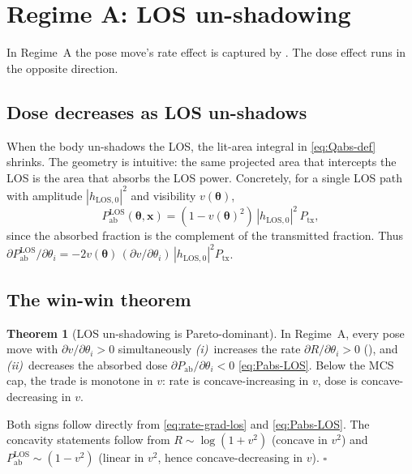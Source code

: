 \documentclass[11pt,a4paper]{article}
\theoremstyle{definition}
\newtheorem{theorem}{Theorem}[section]
\newcommand{\xvec}{\mathbf{x}}
\newcommand{\thetab}{\bm{\theta}}
\newcommand{\Pabs}{P_{\mathrm{ab}}}
\begin{document}
\section{Regime A: LOS un-shadowing}\label{sec:los-unshadow}

In Regime~A the pose move's rate effect is captured by
.  The dose effect runs in the opposite
direction.

\subsection{Dose decreases as LOS un-shadows}

When the body un-shadows the LOS, the lit-area integral in
\eqref{eq:Qabs-def} shrinks.  The geometry is intuitive: the same
projected area that intercepts the LOS is the area that absorbs the
LOS power.  Concretely, for a single LOS path with amplitude
$|h_{\mathrm{LOS},0}|^2$ and visibility $v(\thetab)$,
\begin{equation}\label{eq:Pabs-LOS}
  \Pabs^{\mathrm{LOS}}(\thetab,\xvec)
  =(1-v(\thetab)^2)\,|h_{\mathrm{LOS},0}|^2\,P_{\mathrm{tx}},
\end{equation}
since the absorbed fraction is the complement of the transmitted
fraction.  Thus
$\partial\Pabs^{\mathrm{LOS}}/\partial\theta_i = -2v(\thetab)\,
(\partial v/\partial\theta_i)\,|h_{\mathrm{LOS},0}|^2P_{\mathrm{tx}}$.

\subsection{The win-win theorem}

\begin{theorem}[LOS un-shadowing is Pareto-dominant]\label{thm:los-pareto}
In Regime~A, every pose move with
$\partial v/\partial\theta_i>0$ simultaneously
\emph{(i)}~increases the rate
$\partial R/\partial\theta_i>0$
(), and
\emph{(ii)}~decreases the absorbed dose
$\partial\Pabs/\partial\theta_i<0$
\eqref{eq:Pabs-LOS}.  Below the MCS cap, the trade is monotone in
$v$: rate is concave-increasing in $v$, dose is concave-decreasing
in $v$.
\end{theorem}

\noindent Both signs follow directly from \eqref{eq:rate-grad-los}
and \eqref{eq:Pabs-LOS}.  The concavity statements follow from
$R\sim\log(1+v^2)$ (concave in $v^2$) and $\Pabs^{\mathrm{LOS}}\sim
(1-v^2)$ (linear in $v^2$, hence concave-decreasing in $v$).
$\square$
\end{document}
